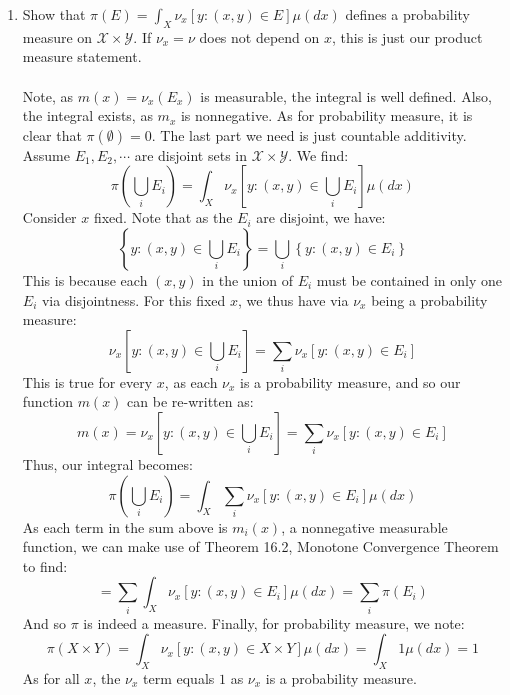 \documentclass[12pt,a4paper]{article}
\newcommand{\1}[1]{\mathbbm{1}\left\{ #1 \right\}}
\newcommand{\xcal}{\mathcal{X}}
\newcommand{\ycal}{\mathcal{Y}}
\begin{document}
\begin{enumerate}
	$$
		m_{A_1 \cup \cdots}^{-1}(R) =
		\left\{x : \nu_x((A_1 \cup \cdots)_x) \in R\right\} =
		\left\{x : \nu_x((A_1)_x) + \nu_x((A_2)_x) + \cdots \in R \right\}
	$$
	We can split the sum via being disjoint, and for each $x$, $\nu_x$ is a measure. Now, note that if that sum is in $R$, we have:
	$$
		m_{A_1}(x) + m_{A_2}(x) + \cdots \in R \implies
		m_{A_1 \cup \cdots}^{-1}(R) = \left[\sum_n m_{A_i}\right]^{-1}(R)
	$$
	And we finally note that the countable sum of nonnegative measurable functions is still measurable (Theorem 13.4). So, the final property to prove $\lambda$ system will be closed under proper differences. Note, I don't want to go through it, but the argument is the same as the one I laid out for the existence of the product measure between $\sigma$ finite spaces. And so, $m_E(x) = \nu_x[y : (x, y) \in E]$ is measurable $X$ for all $E \in \xcal \times \ycal$.
	
	\item Show that $\pi(E) = \int_X \nu_x[y: (x, y) \in E] \mu(dx)$ defines a probability measure on $\xcal \times \ycal$. If $\nu_x = \nu$ does not depend on $x$, this is just our product measure statement.
	\\\\
	Note, as $m(x) = \nu_x(E_x)$ is measurable, the integral is well defined. Also, the integral exists, as $m_x$ is nonnegative. As for probability measure, it is clear that $\pi(\emptyset) = 0$. The last part we need is just countable additivity. Assume $E_1, E_2, \cdots$ are disjoint sets in $\xcal \times \ycal$. We find:
	$$
		\pi\left(\bigcup_i E_i\right) =
		\int_X \nu_x\left[y: (x, y) \in \bigcup_i E_i\right] \mu(dx)
	$$
	Consider $x$ fixed. Note that as the $E_i$ are disjoint, we have:
	$$
		\left\{y: (x, y) \in \bigcup_i E_i\right\} =
		\bigcup_i \left\{y: (x, y) \in E_i\right\}
	$$
	This is because each $(x,y)$ in the union of $E_i$ must be contained in only one $E_i$ via disjointness. For this fixed $x$, we thus have via $\nu_x$ being a probability measure:
	$$
		\nu_x\left[y: (x, y) \in \bigcup_i E_i\right] =
		\sum_i \nu_x\left[y: (x, y) \in E_i\right]
	$$
	This is true for every $x$, as each $\nu_x$ is a probability measure, and so our function $m(x)$ can be re-written as:
	$$
		m(x) = \nu_x\left[y: (x, y) \in \bigcup_i E_i\right] =
		\sum_i \nu_x\left[y: (x, y) \in E_i\right]
	$$
	Thus, our integral becomes:
	$$
		\pi\left(\bigcup_i E_i\right) =
		\int_X \sum_i \nu_x\left[y: (x, y) \in E_i\right] \mu(dx)
	$$
	As each term in the sum above is $m_i(x)$, a nonnegative measurable function, we can make use of Theorem 16.2, Monotone Convergence Theorem to find:
	$$
		= \sum_i \int_X \nu_x\left[y: (x, y) \in E_i\right] \mu(dx) =
		\sum_i \pi(E_i)
	$$
	And so $\pi$ is indeed a measure. Finally, for probability measure, we note:
	$$
		\pi(X \times Y) =
		\int_X \nu_x[y: (x, y) \in X \times Y] \mu(dx) =
		\int_X 1 \mu(dx) = 1
	$$
	As for all $x$, the $\nu_x$ term equals $1$ as $\nu_x$ is a probability measure.
	

\end{enumerate}
\end{document}

